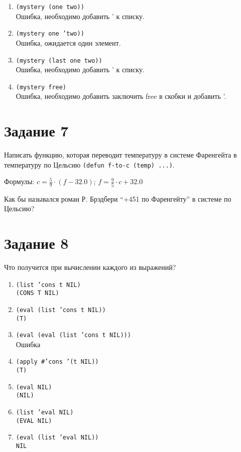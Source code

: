 \begin{enumerate}
	\item \texttt{(mystery (one two))}
	\\ Ошибка, необходимо добавить ' к списку.
	
	\item \texttt{(mystery one 'two))}
	\\ Ошибка, ожидается один элемент.
	
	\item \texttt{(mystery (last one two))}
	\\ Ошибка, необходимо добавить ' к списку.
	
	\item \texttt{(mystery free)}
	\\ Ошибка, необходимо добавить заключить free в скобки и добавить '.
\end{enumerate}

\section{Задание 7}

Написать функцию, которая переводит температуру в системе Фаренгейта в температуру по Цельсию \texttt{(defun f-to-c (temp) ...)}.

Формулы: $c = \frac{5}{9} \cdot (f - 32.0)$; $f = \frac{9}{5} \cdot c + 32.0$

Как бы назывался роман Р. Брэдбери ``+451 по Фаренгейту'' в системе по Цельсию?


\section{Задание 8}

Что получится при вычислении каждого из выражений?

\begin{enumerate}
	\item \texttt{(list 'cons t NIL)}
	\\ \texttt{(CONS T NIL)}
	
	\item \texttt{(eval (list 'cons t NIL))}
	\\ \texttt{(T)}
	
	\item \texttt{(eval (eval (list 'cons t NIL)))}
	\\ Ошибка
	
	\item \texttt{(apply \#'cons '(t NIL))}
	\\ \texttt{(T)}
	
	\item \texttt{(eval NIL)}
	\\ \texttt{(NIL)}
	
	\item \texttt{(list 'eval NIL)}
	\\ \texttt{(EVAL NIL)}
	
	\item \texttt{(eval (list 'eval NIL))}
	\\ \texttt{NIL}
\end{enumerate}
